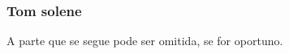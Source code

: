 \subsubsection{Tom solene}
\begin{rubrica}
  A parte que se segue pode ser omitida, se for oportuno.
\end{rubrica}



